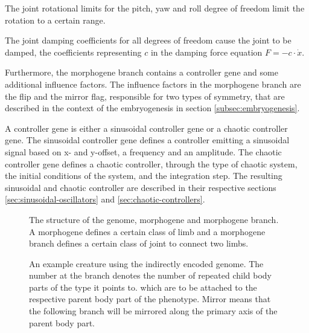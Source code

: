 \documentclass[main]{subfiles}
\begin{document}
The joint rotational limits for the pitch, yaw and roll degree of freedom limit the rotation to a certain range. %

The joint damping coefficients for all degrees of freedom cause the joint to be damped, the coefficients representing \(c\) in the damping force equation \(F = -c \cdot \dot x\). %

Furthermore, the morphogene branch contains a controller gene and some additional influence factors. %
%
The influence factors in the morphogene branch are the flip and the mirror flag, responsible for two types of symmetry, that are described in the context of the embryogenesis in section \ref{subsec:embryogenesis}.

A controller gene is either a sinusoidal controller gene or a chaotic controller gene. %
%
The sinusoidal controller gene defines a controller emitting a sinusoidal signal based on x- and y-offset, a frequency and an amplitude. %
%
The chaotic controller gene defines a chaotic controller, through the type of chaotic system, the initial conditions of the system, and the integration step. %
%
The resulting sinusoidal and chaotic controller are described in their respective sections \ref{sec:sinusoidal-oscillators} and \ref{sec:chaotic-controllers}.


\begin{figure}[H]
\center


\caption[Indirectly encoded genome structure]{The structure of the genome, morphogene and morphogene branch. A morphogene defines a certain class of limb and a morphogene branch defines a certain class of joint to connect two limbs.}
\label{figure:genome-structure}
\end{figure}

\begin{figure}[H]
\center


\caption[Possible indirectly encoded genome]{An example creature using the indirectly encoded genome. The number at the branch denotes the number of repeated child body parts of the type it points to. which are to be attached to the respective parent body part of the phenotype. Mirror means that the following branch will be mirrored along the primary axis of the parent body part.}
\label{figure:indirect-genotype}
\end{figure}
\end{document}
